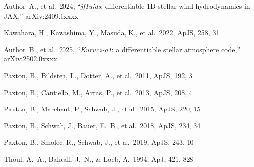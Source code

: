 \documentclass[twocolumn]{aastex631}
\begin{document}
\begin{thebibliography}{}
Author~A., et al.\ 2024, ``\textit{jf1uids}: differentiable 1D stellar wind hydrodynamics in JAX,'' arXiv:2409.0xxxx

Kawahara, H., Kawashima, Y., Masuda, K., et al.\ 2022, ApJS, 258, 31

Author~B., et al.\ 2025, ``\textit{Kurucz-a1}: a differentiable stellar atmosphere code,'' arXiv:2502.0xxxx

Paxton, B., Bildsten, L., Dotter, A., et al.\ 2011, ApJS, 192, 3

Paxton, B., Cantiello, M., Arras, P., et al.\ 2013, ApJS, 208, 4

Paxton, B., Marchant, P., Schwab, J., et al.\ 2015, ApJS, 220, 15

Paxton, B., Schwab, J., Bauer, E.~B., et al.\ 2018, ApJS, 234, 34

Paxton, B., Smolec, R., Schwab, J., et al.\ 2019, ApJS, 243, 10

Thoul, A.~A., Bahcall, J.~N., \& Loeb, A.\ 1994, ApJ, 421, 828

\end{thebibliography}
\end{document}
